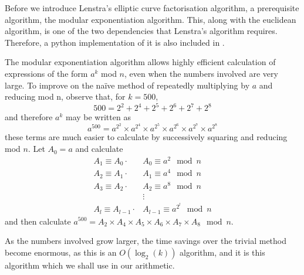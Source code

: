Before we introduce Lenstra's elliptic curve factorisation algorithm, a prerequisite algorithm, the modular exponentiation algorithm.
This, along with the euclidean algorithm, is one of the two dependencies that Lenstra's algorithm requires.
Therefore, a python implementation of it is also included in .
\begin{definition}
	The modular exponentiation algorithm allows highly efficient calculation of expressions of the form $a^k$ mod $n$, even when the numbers involved are very large.
	To improve on the naïve method of repeatedly multiplying by $a$ and reducing mod n, observe that, for $k=500$,
$$500=2^2+2^4+2^5+2^6+2^7+2^8$$
and therefore $a^k$ may be written as
$$a^{500} = a^{2^{2}} \times a^{2^{4}} \times a^{2^{5}} \times a^{2^{6}} \times a^{2^{7}} \times a^{2^{8}}$$
these terms are much easier to calculate by successively squaring and reducing mod $n$.
Let $A_0 = a$ and calculate
\begin{align*}
	A_1\equiv A_0\cdot &A_0 \equiv a^2 \mod n\\
	A_2\equiv A_1\cdot &A_1 \equiv a^4 \mod n\\
	A_3\equiv A_2\cdot &A_2 \equiv a^8 \mod n\\
	&\vdots\\
	A_l\equiv A_{l-1}\cdot &A_{l-1} \equiv a^{2^{l}} \mod n
\end{align*}
and then calculate $a^{500} = A_2 \times A_4 \times A_5 \times A_6 \times A_7 \times A_8 \mod n$.
\end{definition}
As the numbers involved grow larger, the time savings over the trivial method become enormous, as this is an $O(\log_2(k))$ algorithm, and it is this algorithm which we shall use in our arithmetic.


